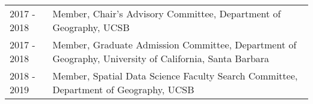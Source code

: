 
\begin{supertabular}{lp{15cm}} 
2017 - 2018 & Member, Chair's Advisory Committee, Department of Geography, UCSB \\
2017 - 2018 & Member, Graduate Admission Committee, Department of Geography, University of California, Santa Barbara \\
2018 - 2019 & Member, Spatial Data Science Faculty Search Committee, Department of Geography, UCSB \\
\end{supertabular}

